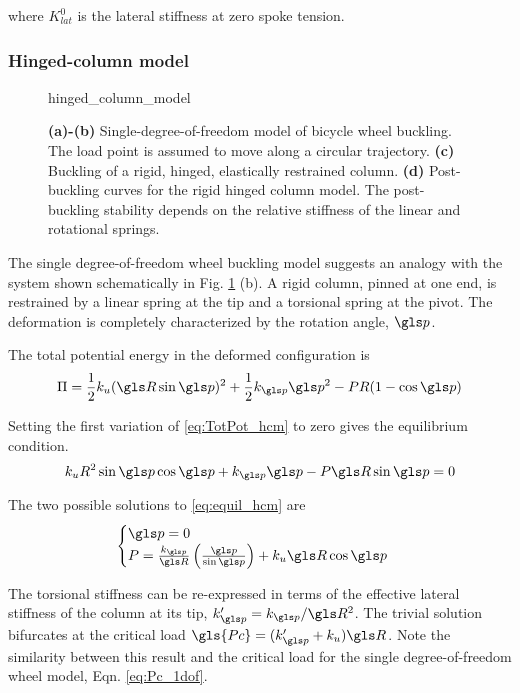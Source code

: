 \documentclass[\rootdir/thesis.tex]{subfiles}
\begin{document}
where $K_{lat}^0$ is the lateral stiffness at zero spoke tension.

\subsubsection*{Hinged-column model}

\begin{figure}[t]	
\centering
{hinged_column_model}
\caption[Single-degree-of-freedom wheel buckling model]{\textbf{(a)-(b)} Single-degree-of-freedom model of bicycle wheel buckling. The load point is assumed to move along a circular trajectory. \textbf{(c)} Buckling of a rigid, hinged, elastically restrained column. \textbf{(d)} Post-buckling curves for the rigid hinged column model. The post-buckling stability depends on the relative stiffness of the linear and rotational springs.}
\label{fig:hinged_column_model}
\end{figure}

The single degree-of-freedom wheel buckling model suggests an analogy with the system shown schematically in Fig. \ref{fig:hinged_column_model} (b). A rigid column, pinned at one end, is restrained by a linear spring at the tip and a torsional spring at the pivot. The deformation is completely characterized by the rotation angle, $\p$.

The total potential energy in the deformed configuration is
\begin{equation}
\label{eq:TotPot_hcm}
\Pi = \frac{1}{2}k_u(\R\sin{\p})^2 + \frac{1}{2}k_{\p}\p^2
    - PR(1-\cos{\p})
\end{equation}

Setting the first variation of \eqref{eq:TotPot_hcm} to zero gives the equilibrium condition.
\begin{equation}
\label{eq:equil_hcm}
k_u R^2 \sin{\p}\cos{\p} + k_{\p}\p - P\R\sin{\p} = 0
\end{equation}

The two possible solutions to \eqref{eq:equil_hcm} are
\begin{equation}
\label{eq:P_hcm}
\begin{cases}
\p = 0\\
P = \frac{k_{\p}}{\R}\left(\frac{\p}{\sin{\p}}\right) + k_u \R\cos{\p}
\end{cases}
\end{equation}

The torsional stiffness can be re-expressed in terms of the effective lateral stiffness of the column at its tip, $k'_{\p}=k_{\p}/\R^2$. The trivial solution bifurcates at the critical load $\gls{Pc}=(k'_{\p} + k_u) \R$. Note the similarity between this result and the critical load for the single degree-of-freedom wheel model, Eqn. \eqref{eq:Pc_1dof}.
\end{document}
